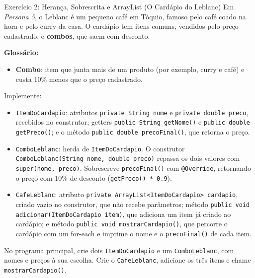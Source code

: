 \begin{exercicio}{Exercício 2: Herança, Sobrescrita e ArrayList (O Cardápio do Leblanc)}
Em \textit{Persona 5}, o Leblanc é um pequeno café em Tóquio, famoso pelo café coado na hora e
pelo curry da casa. O cardápio tem itens comuns, vendidos pelo preço cadastrado, e
\textbf{combos}, que saem com desconto.

\textbf{Glossário:}
\begin{itemize}
    \item \textbf{Combo}: item que junta mais de um produto (por exemplo, curry e café) e custa
    10\% menos que o preço cadastrado.
\end{itemize}

Implemente:

\begin{itemize}
    \item \texttt{ItemDoCardapio}: atributos \texttt{private String nome} e
    \texttt{private double preco}, recebidos no construtor; getters
    \texttt{public String getNome()} e \texttt{public double getPreco()}; e o método
    \texttt{public double precoFinal()}, que retorna o preço.

    \item \texttt{ComboLeblanc}: herda de \texttt{ItemDoCardapio}. O construtor
    \texttt{ComboLeblanc(String nome, double preco)} repassa os dois valores com
    \texttt{super(nome, preco)}. Sobrescreve \texttt{precoFinal()} com \texttt{@Override},
    retornando o preço com 10\% de desconto (\texttt{getPreco() * 0.9}).

    \item \texttt{CafeLeblanc}: atributo \texttt{private ArrayList<ItemDoCardapio> cardapio},
    criado vazio no construtor, que não recebe parâmetros; método \texttt{public void adicionar(ItemDoCardapio item)}, que
    adiciona um item já criado ao cardápio; e método \texttt{public void mostrarCardapio()},
    que percorre o cardápio com um for-each e imprime o nome e o \texttt{precoFinal()} de cada
    item.
\end{itemize}

No programa principal, crie dois \texttt{ItemDoCardapio} e um \texttt{ComboLeblanc}, com nomes e
preços à sua escolha. Crie o \texttt{CafeLeblanc}, adicione os três itens e chame
\texttt{mostrarCardapio()}.
\end{exercicio}

